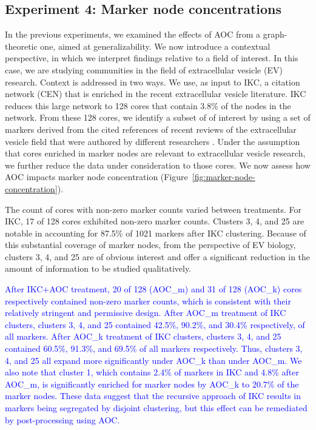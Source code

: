 \documentclass[12pt, oneside]{article}   	%
\begin{document}
\subsection{Experiment 4: Marker node concentrations}

In the previous experiments, we examined the effects of AOC from a graph-theoretic one, aimed at generalizability. We now introduce a contextual perspective, in which we interpret findings relative to a field of interest. In this case, we are studying communities in the field of extracellular vesicle (EV) research. Context is addressed in two ways. We use, as input to IKC, a citation network (CEN) that is enriched in the recent extracellular vesicle literature. IKC reduces this large network to 128 cores that contain 3.8\% of the nodes in the network. From these 128 cores, we identify a subset of of interest by using a set of markers derived from the cited references of recent reviews of the extracellular vesicle field that were authored by different researchers \citep{Wedell2022}. Under the assumption that cores enriched in marker nodes are relevant to extracellular vesicle research, we further reduce the data under consideration to those cores. We now assess how AOC impacts marker node concentration (Figure~\ref{fig:marker-node-concentration}).

The count of cores with non-zero marker counts varied between treatments. For IKC, 17 of 128 cores exhibited  non-zero marker counts. Clusters 3, 4, and 25 are notable in accounting for 87.5\% of 1021 markers after IKC clustering. Because of this substantial coverage of marker nodes, from the perspective of EV biology, clusters 3, 4, and 25 are of obvious interest and offer a significant reduction in the amount of information to be studied qualitatively.  

\textcolor{blue}{After IKC+AOC treatment, 20 of 128 (AOC\_m) and 31 of 128 (AOC\_k) cores respectively contained non-zero marker counts, which is consistent with their relatively stringent and permissive design. After AOC\_m treatment of IKC clusters, clusters 3, 4, and 25  contained 42.5\%, 90.2\%, and 30.4\% respectively, of all markers. After AOC\_k treatment of IKC clusters, clusters  3, 4, and 25 contained 60.5\%, 91.3\%, and 69.5\% of all markers respectively.  Thus,  clusters 3, 4, and 25 all expand more significantly under AOC\_k than under AOC\_m. We also note that cluster 1, which contains 2.4\% of markers in IKC and 4.8\% after AOC\_m, is significantly enriched for marker nodes by AOC\_k to 20.7\% of the marker nodes. These data  suggest that the recursive approach of IKC results in markers being segregated by disjoint clustering, but this effect can be remediated by post-processing using AOC.}
\end{document}
